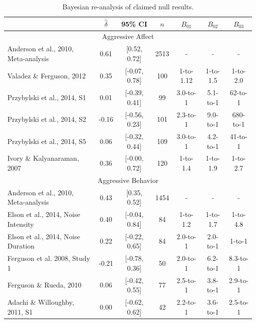 \documentclass[man]{apa6}
\begin{document}
\begin{table}
\caption{Bayesian re-analysis of claimed null results.}
\begin{tabular}{lcccccc}
&$\hat{\delta}$   &95\% CI&$n$  &$B_{01}$ & $B_{02}$ &$B_{03}$ \\ \hline
\multicolumn{7}{c}{Aggressive Affect}\\
Anderson et al., 2010, Meta-analysis&0.61&[0.52, 0.72]&2513&-&-&- \\
\hspace{.2in} Valadez \& Ferguson, 2012&0.35&[-0.07, 0.78]&100&1-to-1.12&1-to-1.5&1-to-2.0 \\ %
\hspace{.2in} Przybylski et al., 2014, S1&0.01&[-0.39, 0.41]&99&3.0-to-1&5.1-to-1&62-to-1 \\
\hspace{.2in} Przybylski et al., 2014, S2&-0.16&[-0.56, 0.23]&101&2.3-to-1&9.0-to-1&680-to-1 \\ %
\hspace{.2in} Przybylski et al., 2014, S5&0.06&[-0.32, 0.44]&109&3.0-to-1&4.2-to-1&41-to-1 \\
\hspace{.2in} Ivory \& Kalyanaraman, 2007&0.36&[-0.00, 0.72]&120&1-to-1.4&1-to-1.9&1-to-2.7 \\
\multicolumn{7}{c}{Aggressive Behavior}\\
Anderson et al., 2010, Meta-analysis&0.43&[0.35, 0.52]&1454&-&-&- \\
\hspace{.2in} Elson et al., 2014, Noise Intensity&0.40&[-0.04, 0.84]&84&1-to-1.2&1-to-1.7&1-to-4.8 \\
\hspace{.2in} Elson et al., 2014, Noise Duration&0.22&[-0.22, 0.65]&84&2.0-to-1&2.0-to-1&1-to-1 \\
\hspace{.2in} Ferguson et al. 2008, Study 1 &-0.21&[-0.78, 0.36]&50&2.0-to-1&6.2-to-1&8.3-to-1 \\ %
\hspace{.2in} Ferguson \& Rueda, 2010 &0.06&[-0.42, 0.55]&77&2.5-to-1&3.8-to-1&2.9-to-1 \\
\hspace{.2in} Adachi \& Willoughby, 2011, S1&0.00&[-0.62, 0.62]&42&2.2-to-1&3.6-to-1&2.5-to-1 \\

\end{tabular}
\end{table}
\end{document}
